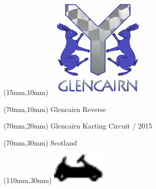 \null\newpage
\begin{textblock*}{50mm}(15mm,10mm)%
\includegraphics[width=50mm]{LG/GLE.png}
\end{textblock*}
\begin{textblock*}{130mm}(70mm,10mm)%
{\fontsize{20}{20}\selectfont Glencairn Reverse}\\
\end{textblock*}
\begin{textblock*}{120mm}(70mm,20mm)%
{\fontsize{16}{16}\selectfont Glencairn Karting Circuit / 2015}\\
\end{textblock*}
\begin{textblock*}{120mm}(70mm,30mm)%
{\fontsize{12}{12}\selectfont Scotland}
\end{textblock*}
\begin{textblock*}{30mm}(110mm,30mm)%
\centering
\includegraphics[height=15mm]{icons/kart.pdf}
\end{textblock*}

